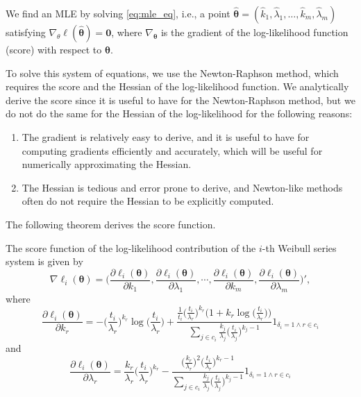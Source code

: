 \documentclass[
]{article}
\begin{document}
We find an MLE by solving \eqref{eq:mle_eq}, i.e., a point
\(\boldsymbol{\hat\theta} = (\hat{k}_1,\hat{\lambda}_1,\ldots,\hat{k}_m,\hat{\lambda}_m)\)
satisfying
\(\nabla_{\theta} \ell(\boldsymbol{\hat\theta}) = \boldsymbol{0}\),
where \(\nabla_{\boldsymbol{\theta}}\) is the gradient of the
log-likelihood function (score) with respect to \(\boldsymbol{\theta}\).

To solve this system of equations, we use the Newton-Raphson method,
which requires the score and the Hessian of the log-likelihood function.
We analytically derive the score since it is useful to have for the
Newton-Raphson method, but we do not do the same for the Hessian of the
log-likelihood for the following reasons:

\begin{enumerate}
\def\labelenumi{\arabic{enumi}.}
\item
  The gradient is relatively easy to derive, and it is useful to have
  for computing gradients efficiently and accurately, which will be
  useful for numerically approximating the Hessian.
\item
  The Hessian is tedious and error prone to derive, and Newton-like
  methods often do not require the Hessian to be explicitly computed.
\end{enumerate}

The following theorem derives the score function.

\begin{theorem}
\label{thm:weibull_score}
The score function of the log-likelihood contribution of the $i$-th Weibull series
system is given by
\begin{equation}
\label{eq:weibull_score}
\nabla \ell_i(\boldsymbol{\theta}) = \biggl(
    \frac{\partial \ell_i(\boldsymbol{\theta})}{\partial k_1},
    \frac{\partial \ell_i(\boldsymbol{\theta})}{\partial \lambda_1},
    \cdots, 
    \frac{\partial \ell_i(\boldsymbol{\theta})}{\partial k_m},
    \frac{\partial \ell_i(\boldsymbol{\theta})}{\partial \lambda_m} \biggr)',
\end{equation}
where
\begin{equation}
\frac{\partial \ell_i(\boldsymbol{\theta})}{\partial k_r} = 
    -\biggl(\frac{t_i}{\lambda_r}\biggr)^{k_r}    
        \!\!\log\biggl(\frac{t_i}{\lambda_r}\biggr) +
        \frac{\frac{1}{t_i} \bigl(\frac{t_i}{\lambda_r}\bigr)^{k_r}
            \bigl(1+ k_r \log\bigl(\frac{t_i}{\lambda_r}\bigr)\bigr)}
            {\sum_{j \in c_i} \frac{k_j}{\lambda_j}\bigl(\frac{t_i}{\lambda_j}\bigr)^{k_j-1}}
        1_{\delta_i = 1 \land r \in c_i}
\end{equation}
and 
\begin{equation}
\frac{\partial \ell_i(\boldsymbol{\theta})}{\partial \lambda_r} = 
    \frac{k_r}{\lambda_r} \biggl(\frac{t_i}{\lambda_r}\biggr)^{k_r} -
    \frac{
        \bigl(\frac{k_r}{\lambda_r}\bigr)^2 \bigl(\frac{t_i}{\lambda_r}\bigr)^{k_r - 1}
    }
    {
        \sum_{j \in c_i} \frac{k_j}{\lambda_j}\bigl(\frac{t_i}{\lambda_j}\bigr)^{k_j-1}
    }
    1_{\delta_i = 1 \land r \in c_i}
\end{equation}
\end{theorem}
\end{document}
